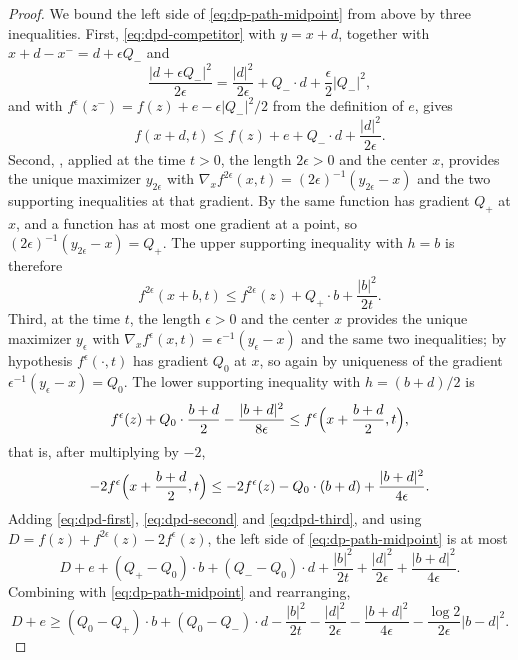 \begin{proof}
We bound the left side of \eqref{eq:dp-path-midpoint} from above by three
inequalities. First, \eqref{eq:dpd-competitor} with $y=x+d$, together with
$x+d-x^-=d+\epsilon Q_-$ and
\[
  \frac{|d+\epsilon Q_-|^2}{2\epsilon}
   =\frac{|d|^2}{2\epsilon}+Q_-\cdot d+\frac{\epsilon}{2}|Q_-|^2,
\]
and with $f^\epsilon(z^-)=f(z)+e-\epsilon|Q_-|^2/2$ from the definition of $e$,
gives
\begin{equation}\label{eq:dpd-first}
  f(x+d,t)\le f(z)+e+Q_-\cdot d+\frac{|d|^2}{2\epsilon}.
\end{equation}
Second, , applied at the time $t>0$, the length
$2\epsilon>0$ and the center $x$, provides the unique maximizer $y_{2\epsilon}$
with $\nabla_xf^{2\epsilon}(x,t)=(2\epsilon)^{-1}(y_{2\epsilon}-x)$ and the two
supporting inequalities at that gradient. By  the
same function has gradient $Q_+$ at $x$, and a function has at most one
gradient at a point, so $(2\epsilon)^{-1}(y_{2\epsilon}-x)=Q_+$. The upper
supporting inequality with $h=b$ is therefore
\begin{equation}\label{eq:dpd-second}
  f^{2\epsilon}(x+b,t)\le f^{2\epsilon}(z)+Q_+\cdot b+\frac{|b|^2}{2t}.
\end{equation}
Third,  at the time $t$, the length
$\epsilon>0$ and the center $x$ provides the unique maximizer $y_\epsilon$ with
$\nabla_xf^\epsilon(x,t)=\epsilon^{-1}(y_\epsilon-x)$ and the same two
inequalities; by hypothesis $f^\epsilon(\cdot,t)$ has gradient $Q_0$ at $x$, so
again by uniqueness of the gradient $\epsilon^{-1}(y_\epsilon-x)=Q_0$. The
lower supporting inequality with $h=(b+d)/2$ is
\[
  f^\epsilon(z)+Q_0\cdot\frac{b+d}{2}-\frac{|b+d|^2}{8\epsilon}
   \le f^\epsilon\Bigl(x+\frac{b+d}{2},t\Bigr),
\]
that is, after multiplying by $-2$,
\begin{equation}\label{eq:dpd-third}
  -2f^\epsilon\Bigl(x+\frac{b+d}{2},t\Bigr)
   \le-2f^\epsilon(z)-Q_0\cdot(b+d)+\frac{|b+d|^2}{4\epsilon}.
\end{equation}
Adding \eqref{eq:dpd-first}, \eqref{eq:dpd-second} and \eqref{eq:dpd-third},
and using $D=f(z)+f^{2\epsilon}(z)-2f^\epsilon(z)$, the left side of
\eqref{eq:dp-path-midpoint} is at most
\[
  D+e+(Q_+-Q_0)\cdot b+(Q_--Q_0)\cdot d
       +\frac{|b|^2}{2t}+\frac{|d|^2}{2\epsilon}
       +\frac{|b+d|^2}{4\epsilon}.
\]
Combining with \eqref{eq:dp-path-midpoint} and rearranging,
\[
  D+e\ge(Q_0-Q_+)\cdot b+(Q_0-Q_-)\cdot d
    -\frac{|b|^2}{2t}-\frac{|d|^2}{2\epsilon}
    -\frac{|b+d|^2}{4\epsilon}-\frac{\log2}{2\epsilon}|b-d|^2 .
\]
\end{proof}
